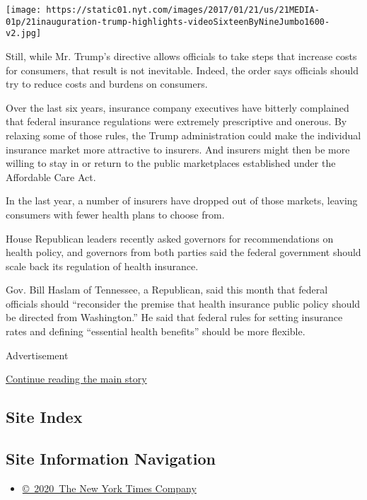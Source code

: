 \texttt{[image: https://static01.nyt.com/images/2017/01/21/us/21MEDIA-01p/21inauguration-trump-highlights-videoSixteenByNineJumbo1600-v2.jpg]}

Still, while Mr. Trump's directive allows officials to take steps that
increase costs for consumers, that result is not inevitable. Indeed, the
order says officials should try to reduce costs and burdens on
consumers.

Over the last six years, insurance company executives have bitterly
complained that federal insurance regulations were extremely
prescriptive and onerous. By relaxing some of those rules, the Trump
administration could make the individual insurance market more
attractive to insurers. And insurers might then be more willing to stay
in or return to the public marketplaces established under the Affordable
Care Act.

In the last year, a number of insurers have dropped out of those
markets, leaving consumers with fewer health plans to choose from.

House Republican leaders recently asked governors for recommendations on
health policy, and governors from both parties said the federal
government should scale back its regulation of health insurance.

Gov. Bill Haslam of Tennessee, a Republican, said this month that
federal officials should ``reconsider the premise that health insurance
public policy should be directed from Washington.'' He said that federal
rules for setting insurance rates and defining ``essential health
benefits'' should be more flexible.

Advertisement

\protect\hyperlink{after-bottom}{Continue reading the main story}

\hypertarget{site-index}{%
\subsection{Site Index}\label{site-index}}

\hypertarget{site-information-navigation}{%
\subsection{Site Information
Navigation}\label{site-information-navigation}}

\begin{itemize}
\tightlist
\item
  \href{https://help.nytimes.com/hc/en-us/articles/115014792127-Copyright-notice}{©~2020~The
  New York Times Company}
\end{itemize}


